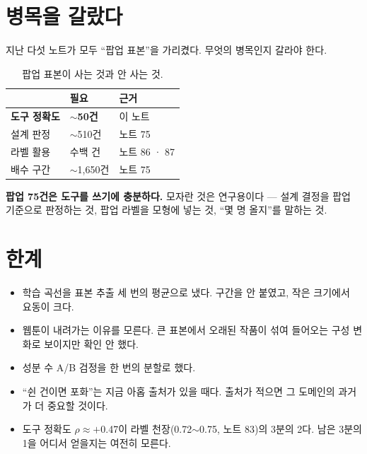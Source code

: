 \documentclass[10pt]{article}
\begin{document}
\section{병목을 갈랐다}

지난 다섯 노트가 모두 ``팝업 표본''을 가리켰다. 무엇의 병목인지 갈라야 한다.

\begin{table}[t]
\centering\tsize
\caption{팝업 표본이 사는 것과 안 사는 것.}
\begin{tabular}{lll}
\toprule
& 필요 & 근거 \\
\midrule
\textbf{도구 정확도} & \textbf{$\sim$50건} & 이 노트 \\
설계 판정 & $\sim$510건 & 노트 75 \\
라벨 활용 & 수백 건 & 노트 86 · 87 \\
배수 구간 & $\sim$1,650건 & 노트 75 \\
\bottomrule
\end{tabular}
\end{table}

\textbf{팝업 75건은 도구를 쓰기에 충분하다.} 모자란 것은 연구용이다 --- 설계
결정을 팝업 기준으로 판정하는 것, 팝업 라벨을 모형에 넣는 것, ``몇 명 올지''를
말하는 것.


\section{한계}

\begin{itemize}[leftmargin=1.1em,itemsep=0.15em]
\item 학습 곡선을 표본 추출 세 번의 평균으로 냈다. 구간을 안 붙였고, 작은
      크기에서 요동이 크다.
\item 웹툰이 내려가는 이유를 모른다. 큰 표본에서 오래된 작품이 섞여 들어오는
      구성 변화로 보이지만 확인 안 했다.
\item 성분 수 A/B 검정을 한 번의 분할로 했다.
\item ``쉰 건이면 포화''는 지금 아홉 출처가 있을 때다. 출처가 적으면 그 도메인의
      과거가 더 중요할 것이다.
\item 도구 정확도 $\rho\approx+$0.47이 라벨 천장(0.72$\sim$0.75, 노트 83)의
      3분의 2다. 남은 3분의 1을 어디서 얻을지는 여전히 모른다.
\end{itemize}
\end{document}
